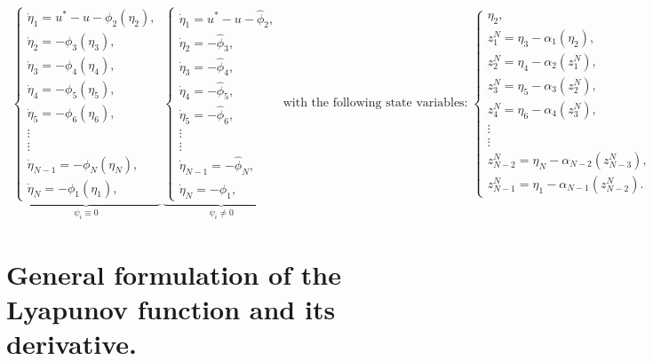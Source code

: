 \documentclass[10pt, a4paper]{amsart}
\theoremstyle{plain}
\theoremstyle{definition}
\theoremstyle{remark}
\numberwithin{equation}{section}
\begin{document}
\begin{align}\label{a3.139}
 \underbrace{\begin{cases}
\dot\eta_1 = u^* - u - \phi_2(\eta_2),\\
\dot\eta_2 =  - \phi_3(\eta_3),\\
\dot\eta_3 =  - \phi_4(\eta_4),\\
\dot\eta_4 =  - \phi_5(\eta_5),\\
\dot\eta_5 =  - \phi_6(\eta_6),\\
\vdots\\
\vdots\\
\dot\eta_{N-1} =-\phi_{N}(\eta_{N}),\\
\dot\eta_{N} =  - \phi_1(\eta_1),
\end{cases}}_{\psi_i\equiv 0}\, \underbrace{\begin{cases}
\dot\eta_1 = u^* - u - \hat\phi_2,\\
\dot\eta_2 = - \hat\phi_3,\\
\dot\eta_3 = - \hat\phi_4,\\
\dot\eta_4 = - \hat\phi_5,\\
\dot\eta_5 =- \hat\phi_6,\\
\vdots\\
\vdots\\
\dot\eta_{N-1} =-\hat\phi_{N},\\
\dot\eta_{N} =  - \hat\phi_1,
\end{cases}}_{\psi_i\neq 0}\;\text{with the following state variables:}\; \begin{cases}
\eta_2,\\
z^N_1=\eta_3-\alpha_1(\eta_2),\\
z^N_2=\eta_4-\alpha_2(z^N_1),\\
z^N_3=\eta_5-\alpha_3(z^N_2),\\
z^N_4=\eta_6-\alpha_4(z^N_3),\\
\vdots\\
\vdots\\
z^N_{N-2}=\eta_{N}-\alpha_{N-2}(z^N_{N-3}),\\
z^N_{N-1}=\eta_1-\alpha_{N-1}(z^N_{N-2}).
\end{cases}
\end{align} 

\section*{\bf General formulation of the Lyapunov function and its derivative.}%
\end{document}
